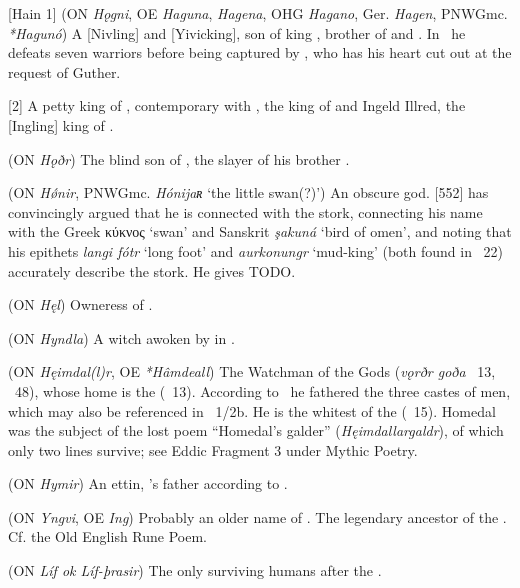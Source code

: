 \begin{itemize}
[Hain 1] (ON \emph{Hǫgni}, OE \emph{Haguna}, \emph{Hagena}, OHG \emph{Hagano}, Ger. \emph{Hagen}, PNWGmc. \emph{*Hagunó})
  A [Nivling] and [Yivicking], son of king , brother of  and . In \Atlakvida\ he defeats seven warriors before being captured by , who has his heart cut out at the request of Guther.

[2]
  A petty king of , contemporary with , the king of  and Ingeld Illred, the [Ingling] king of .

 (ON \emph{Hǫðr})
  The blind son of , the slayer of his brother .

 (ON \emph{Hǿnir}, PNWGmc. \emph{Hónijaʀ} ‘the little swan(?)’)
  An obscure god. \textcite{Rydberg1886}[552] has convincingly argued that he is connected with the stork, connecting his name with the Greek \textgreek{κύκνος} ‘swan’ and Sanskrit \emph{şakuná} ‘bird of omen’, and noting that his epithets \emph{langi fótr} ‘long foot’ and \emph{aurkonungr} ‘mud-king’ (both found in \Skaldskaparmal\ 22) accurately describe the stork. He gives  TODO.

 (ON \emph{Hęl})
  Owneress of .

 (ON \emph{Hyndla})
  A witch awoken by  in \Hyndluljod.

 (ON \emph{Hęimdal(l)r}, OE \emph{*Hâmdeall})
  The Watchman of the Gods (\emph{vǫrðr goða} \Grimnismal\ 13, \Lokasenna\ 48), whose home is the  (\Grimnismal\ 13).  According to \Rigsthula\ he fathered the three castes of men, which may also be referenced in \Voluspa\ 1/2b.  He is the whitest of the  (\Thrymskvida\ 15).  Homedal was the subject of the lost poem “Homedal’s galder” (\emph{Hęimdallargaldr}), of which only two lines survive; see Eddic Fragment 3 under Mythic Poetry.

 (ON \emph{Hymir})
  An ettin, ’s father according to \Hymiskvida.

 (ON \emph{Yngvi}, OE \emph{Ing})
  Probably an older name of . The legendary ancestor of the . Cf. the Old English Rune Poem.

 (ON \emph{Líf ok Líf-þrasir})
  The only surviving humans after the .


\end{itemize}
